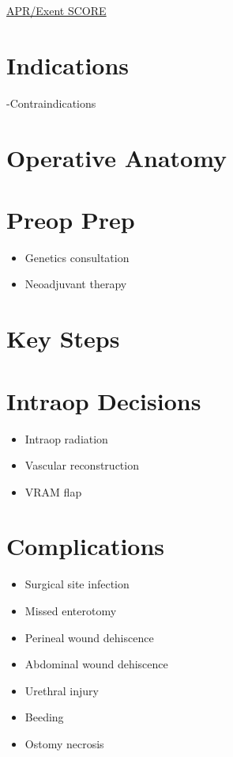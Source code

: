 \documentclass[
]{book}
\providecommand{\tightlist}{%
  \setlength{\itemsep}{0pt}\setlength{\parskip}{0pt}}
\begin{document}
\href{https://www.surgicalcore.org/modulecontent.aspx?id=162148}{APR/Exent SCORE}

\hypertarget{indications-1}{%
\section{Indications}\label{indications-1}}

-Contraindications

\hypertarget{operative-anatomy}{%
\section{Operative Anatomy}\label{operative-anatomy}}

\hypertarget{preop-prep}{%
\section{Preop Prep}\label{preop-prep}}

\begin{itemize}
\tightlist
\item
  Genetics consultation
\item
  Neoadjuvant therapy
\end{itemize}

\hypertarget{key-steps}{%
\section{Key Steps}\label{key-steps}}

\hypertarget{intraop-decisions}{%
\section{Intraop Decisions}\label{intraop-decisions}}

\begin{itemize}
\tightlist
\item
  Intraop radiation
\item
  Vascular reconstruction
\item
  VRAM flap
\end{itemize}

\hypertarget{complications}{%
\section{Complications}\label{complications}}

\begin{itemize}
\tightlist
\item
  Surgical site infection
\item
  Missed enterotomy
\item
  Perineal wound dehiscence
\item
  Abdominal wound dehiscence
\item
  Urethral injury
\item
  Beeding
\item
  Ostomy necrosis
\end{itemize}
\end{document}
